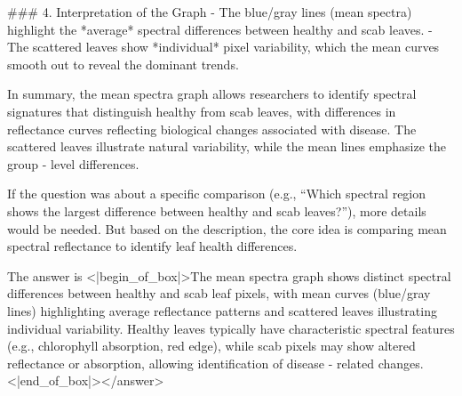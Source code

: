 ### 4. Interpretation of the Graph  
- The blue/gray lines (mean spectra) highlight the *average* spectral differences between healthy and scab leaves.  
- The scattered leaves show *individual* pixel variability, which the mean curves smooth out to reveal the dominant trends.    

In summary, the mean spectra graph allows researchers to identify spectral signatures that distinguish healthy from scab leaves, with differences in reflectance curves reflecting biological changes associated with disease. The scattered leaves illustrate natural variability, while the mean lines emphasize the group - level differences.  

If the question was about a specific comparison (e.g., “Which spectral region shows the largest difference between healthy and scab leaves?”), more details would be needed. But based on the description, the core idea is comparing mean spectral reflectance to identify leaf health differences.  

The answer is <|begin_of_box|>The mean spectra graph shows distinct spectral differences between healthy and scab leaf pixels, with mean curves (blue/gray lines) highlighting average reflectance patterns and scattered leaves illustrating individual variability. Healthy leaves typically have characteristic spectral features (e.g., chlorophyll absorption, red edge), while scab pixels may show altered reflectance or absorption, allowing identification of disease - related changes.<|end_of_box|></answer>